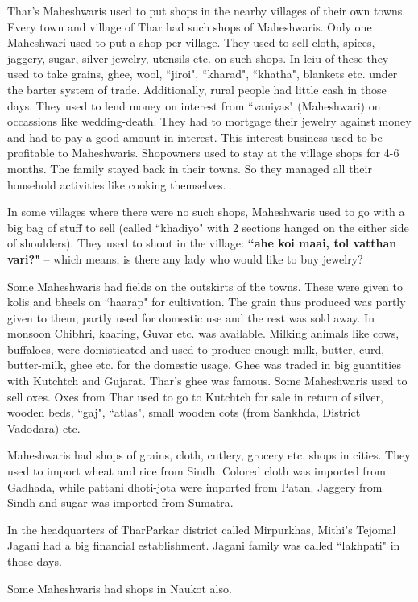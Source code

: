 Thar's Maheshwaris used to put shops in the nearby villages of their own towns. Every town and village of Thar had such shops of Maheshwaris. Only one Maheshwari used to put a shop per village. They used to sell cloth, spices, jaggery, sugar, silver jewelry, utensils etc. on such shops. In leiu of these they used to take grains, ghee, wool, ``jiroi", ``kharad", ``khatha", blankets etc. under the barter system of trade. Additionally, rural people had little cash in those days. They used to lend money on interest from ``vaniyas" (Maheshwari) on occassions like wedding-death. They had to mortgage their jewelry against money and had to pay a good amount in interest. This interest business used to be profitable to Maheshwaris. Shopowners used to stay at the village shops for 4-6 months. The family stayed back in their towns. So they managed all their household activities like cooking themselves.

In some villages where there were no such shops, Maheshwaris used to go with a big bag of stuff to sell (called ``khadiyo" with 2 sections hanged on the either side of shoulders). They used to shout in the village: \textbf{``ahe koi maai, tol vatthan vari?"} -- which means, is there any lady who would like to buy jewelry?

Some Maheshwaris had fields on the outskirts of the towns. These were given to kolis and bheels on ``haarap" for cultivation. The grain thus produced was partly given to them, partly used for domestic use and the rest was sold away. In monsoon Chibhri, kaaring, Guvar etc. was available. Milking animals like cows, buffaloes, were domisticated and used to produce enough milk, butter, curd, butter-milk, ghee etc. for the domestic usage. Ghee was traded in big guantities with Kutchtch and Gujarat. Thar's ghee was famous. Some Maheshwaris used to sell oxes. Oxes from Thar used to go to Kutchtch for sale in return of silver, wooden beds, ``gaj", ``atlas", small wooden cots (from Sankhda, District Vadodara) etc.

Maheshwaris had shops of grains, cloth, cutlery, grocery etc. shops in cities. They used to import wheat and rice from Sindh. Colored cloth was imported from Gadhada, while pattani dhoti-jota were imported from Patan. Jaggery from Sindh and sugar was imported from Sumatra.

In the headquarters of TharParkar district called Mirpurkhas, Mithi's Tejomal Jagani had a big financial establishment. Jagani family was called ``lakhpati" in those days.

Some Maheshwaris had shops in Naukot also.

